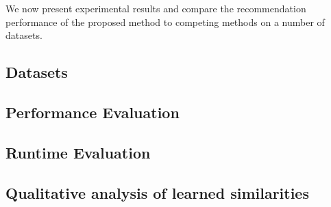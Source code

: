 We now present experimental results and compare the recommendation performance of the proposed method to competing methods on a number of datasets.
\subsection{Datasets}


\subsection{Performance Evaluation}


\subsection{Runtime Evaluation}


\subsection{Qualitative analysis of learned similarities}
